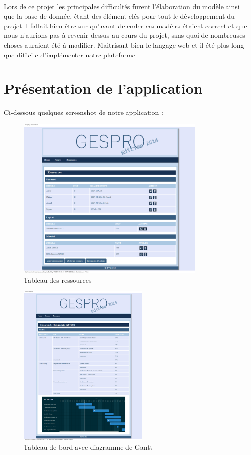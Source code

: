 \documentclass[a4paper, 12pt]{article}
\begin{document}
\paragraph{}Lors de ce projet les principales difficultés furent l'élaboration du modèle ainsi que la base de donnée, étant des élément clés pour tout le développement du projet il fallait bien être sur qu'avant de coder ces modèles étaient correct et que nous n'aurions pas à revenir dessus au cours du projet, sans quoi de nombreuses choses auraient été à modifier. Maitrisant bien le langage web et il été plus long que difficile d'implémenter notre plateforme.

\newpage

\section{Présentation de l'application}
\paragraph{}Ci-dessous quelques screenshot de notre application :
\begin{figure}[h!]
	\centering
	\includegraphics[height=8cm]{Ressources.png}
	\caption{Tableau des ressources}
\end{figure}
\begin{figure}[h!]
	\centering
	\includegraphics[height=8cm]{Tableau_de_bord.png}
	\caption{Tableau de bord avec diagramme de Gantt}
\end{figure}
\end{document}
